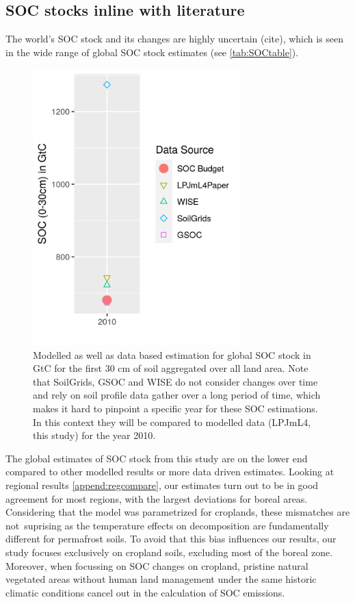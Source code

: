 \documentclass[gc, manuscript]{copernicus}
\begin{document}
\hypertarget{soc-stocks-inline-with-literature}{%
\subsection{SOC stocks inline with literature}\label{soc-stocks-inline-with-literature}}

The world's SOC stock and its changes are highly uncertain (cite), which is seen in the wide range of global SOC stock estimates (see \ref{tab:SOCtable}).

\begin{figure}[H]
\includegraphics[width=8cm]{../ResultNotebooks/Output/Images/glo_comparisonfigure} \caption{Modelled as well as data based estimation for global SOC stock in GtC for the first 30 cm of soil aggregated over all land area. Note that SoilGrids, GSOC and WISE do not consider changes over time and rely on soil profile data gather over a long period of time, which makes it hard to pinpoint a specific year for these SOC estimations. In this context they will be compared to modelled data (LPJmL4, this study) for the year 2010.}\label{fig:SOCtable}
\end{figure}

The global estimates of SOC stock from this study are on the lower end compared to other modelled results or more data driven estimates. Looking at regional results \ref{append:regcompare}, our estimates turn out to be in good agreement for most regions, with the largest deviations for boreal areas. Considering that the model was parametrized for croplands, these mismatches are not~suprising as the temperature effects on decomposition are fundamentally different for permafrost soils. To avoid that this bias influences our results, our study focuses exclusively on cropland soils, excluding most of the boreal zone. Moreover, when focussing on SOC changes on cropland, pristine natural vegetated areas without human land management under the same historic climatic conditions cancel out in the calculation of SOC emissions.
\end{document}
